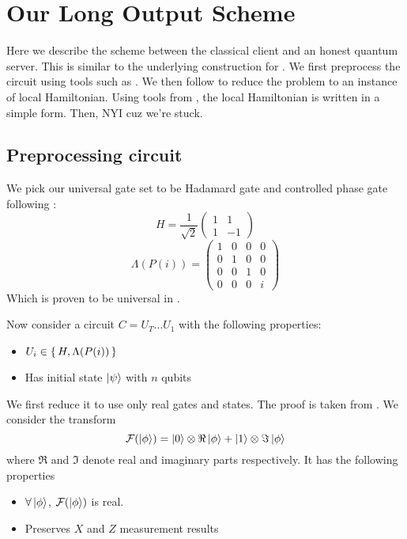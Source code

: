 \section{Our Long Output Scheme}

Here we describe the scheme between the classical client and an honest quantum server. This is similar to the underlying construction for \cite{mahadev_delegation}. We first preprocess the circuit using tools such as \cite{quant-ph/0301040}. We then follow \cite{kitaev2002classical} to reduce the problem to an instance of local Hamiltonian. Using tools from \cite{PhysRevA.93.022326}, the local Hamiltonian is written in a simple form. Then, NYI cuz we're stuck.

\subsection{Preprocessing circuit}

We pick our universal gate set to be Hadamard gate and controlled phase gate following \cite{quant-ph/0301040}:
$$H=\frac{1}{\sqrt{2}}\begin{pmatrix}1&1\\1&-1\end{pmatrix}$$
$$\Lambda(P(i))=\begin{pmatrix}1&0&0&0\\0&1&0&0\\0&0&1&0\\0&0&0&i\end{pmatrix}$$
Which is proven to be universal in \cite{kitaev_1997}.

Now consider a circuit $C=U_T\ldots U_1$ with the following properties:
\begin{itemize}
	\item $U_i\in\set{H, \Lambda(P(i))}$
	\item Has initial state $\ket\psi$ with $n$ qubits
\end{itemize}

We first reduce it to use only real gates and states. The proof is taken from \cite{quant-ph/0301040}. We consider the transform
$$\mathcal{F}(\ket{\phi})=\ket{0}\otimes\Re\ket{\phi}+\ket{1}\otimes\Im\ket{\phi}$$
where $\Re$ and $\Im$ denote real and imaginary parts respectively. It has the following properties

\begin{itemize}
	\item $\forall\ket\phi$, $\mathcal{F}(\ket\phi)$ is real.
	\item Preserves $X$ and $Z$ measurement results
\end{itemize}

